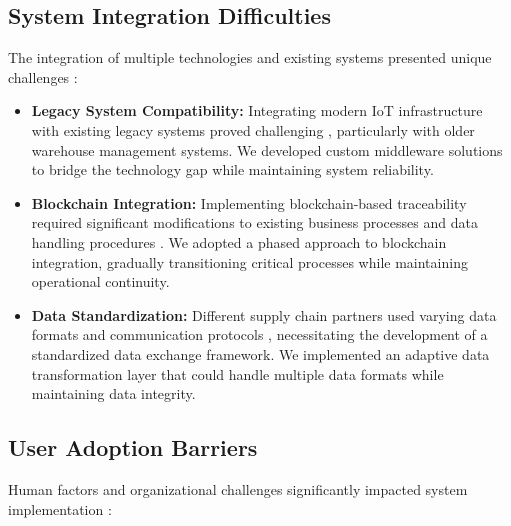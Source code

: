 \documentclass[conference]{IEEEtran}
\begin{document}
\subsection{System Integration Difficulties}
The integration of multiple technologies and existing systems presented unique challenges \cite{ahmed2024optimized}:

\begin{itemize}
    \item \textbf{Legacy System Compatibility:} Integrating modern IoT infrastructure with existing legacy systems proved challenging \cite{hernandez2024implementation}, particularly with older warehouse management systems. We developed custom middleware solutions to bridge the technology gap while maintaining system reliability.
    
    \item \textbf{Blockchain Integration:} Implementing blockchain-based traceability required significant modifications to existing business processes and data handling procedures \cite{al2021prochain}. We adopted a phased approach to blockchain integration, gradually transitioning critical processes while maintaining operational continuity.
    
    \item \textbf{Data Standardization:} Different supply chain partners used varying data formats and communication protocols \cite{visconti2020development}, necessitating the development of a standardized data exchange framework. We implemented an adaptive data transformation layer that could handle multiple data formats while maintaining data integrity.
\end{itemize}

\subsection{User Adoption Barriers}
Human factors and organizational challenges significantly impacted system implementation \cite{tharatipyakul2021user}:
\end{document}
